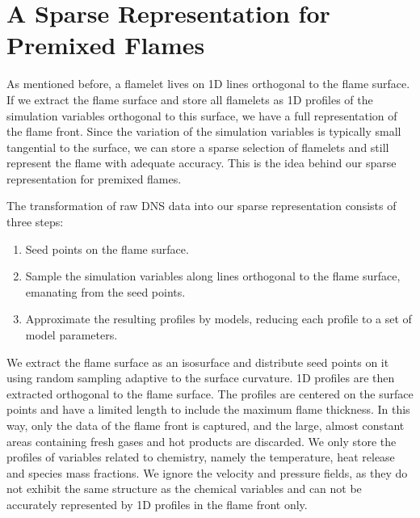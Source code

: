 \section{A Sparse Representation for Premixed Flames}
\label{sec:compression}
%
As mentioned before, a flamelet lives on \ac{1D} lines orthogonal to the flame
surface.
%
If we extract the flame surface and store all flamelets as \ac{1D} profiles of
the simulation variables orthogonal to this surface, we have a full
representation of the flame front.
%
Since the variation of the simulation variables is typically small tangential to
the surface, we can store a sparse selection of flamelets and still represent
the flame with adequate accuracy.
%
This is the idea behind our sparse representation for premixed flames.
%

%
The transformation of raw \ac{DNS} data into our sparse representation consists
of three steps:
%
\begin{enumerate}
	\item Seed points on the flame surface.
	\item Sample the simulation variables along lines orthogonal to the flame
	surface, emanating from the seed points.
	\item Approximate the resulting profiles by models, reducing each profile to
	a set of model parameters.
\end{enumerate}
%

%
We extract the flame surface as an isosurface and distribute seed points on it
using random sampling adaptive to the surface curvature.
%
\ac{1D} profiles are then extracted orthogonal to the flame surface.
%
The profiles are centered on the surface points and have a limited length to
include the maximum flame thickness.
%
In this way, only the data of the flame front is captured, and the large, almost
constant areas containing fresh gases and hot products are discarded.
%
We only store the profiles of variables related to chemistry, namely the
temperature, heat release and species mass fractions.
%
We ignore the velocity and pressure fields, as they do not exhibit the same
structure as the chemical variables and can not be accurately represented by
\ac{1D} profiles in the flame front only.
%


